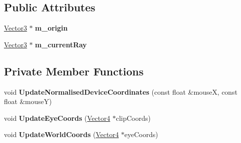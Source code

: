 \subsection*{Public Attributes}
\begin{DoxyCompactItemize}
\item 
\mbox{\label{class_flounder_1_1_ray_a7e9c72157766d8ab5f8e637847beb12c}} 
\hyperlink{class_flounder_1_1_vector3}{Vector3} $\ast$ {\bfseries m\+\_\+origin}
\item 
\mbox{\label{class_flounder_1_1_ray_a1e983d80f20e6ba27a14a90c0e398420}} 
\hyperlink{class_flounder_1_1_vector3}{Vector3} $\ast$ {\bfseries m\+\_\+current\+Ray}
\end{DoxyCompactItemize}
\subsection*{Private Member Functions}
\begin{DoxyCompactItemize}
\item 
\mbox{\label{class_flounder_1_1_ray_ae593d2f2fdbb39c8e5346bbd1132f98d}} 
void {\bfseries Update\+Normalised\+Device\+Coordinates} (const float \&mouseX, const float \&mouseY)
\item 
\mbox{\label{class_flounder_1_1_ray_aa797595c77b7972ad6e112ad73080645}} 
void {\bfseries Update\+Eye\+Coords} (\hyperlink{class_flounder_1_1_vector4}{Vector4} $\ast$clip\+Coords)
\item 
\mbox{\label{class_flounder_1_1_ray_a5c3602beb1d1a6277590cbc677bb21d3}} 
void {\bfseries Update\+World\+Coords} (\hyperlink{class_flounder_1_1_vector4}{Vector4} $\ast$eye\+Coords)
\end{DoxyCompactItemize}
